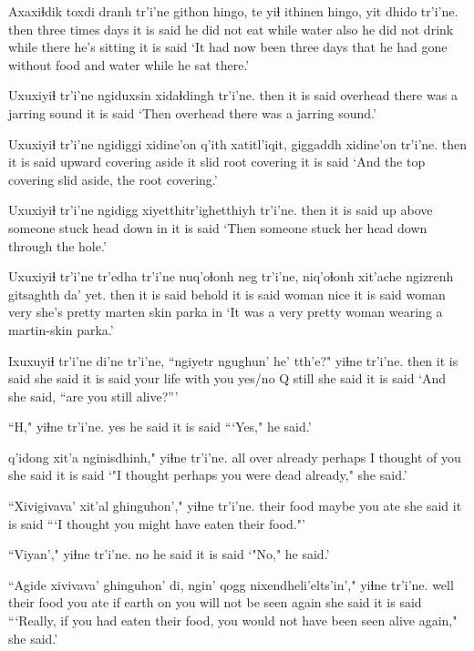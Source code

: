 \documentclass[12pt]{article}
\begin{document}
\gll Axaxiɬdik toxdi dranh tr'i'ne githon hingo, te yiɬ ithinen  hingo, yit dhido tr'i'ne.
then  {three times} days  {it is said} {he did not eat} while water also {he did not drink} while there {he's sitting} {it is said}
\glt `It had now been three days that he had gone without food and water while he sat there.'
\glend

\gll Uxuxiyiɬ tr'i'ne ngiduxsin xidaɬdingh   tr'i'ne.
then  {it is said} overhead {there was a jarring sound} {it is said}
\glt `Then overhead there was a jarring sound.'
\glend

\gll Uxuxiyiɬ tr'i'ne ngidiggi  xidine'on q'ith xatitl'iqit, giggaddh xidine'on tr'i'ne.
then  {it is said} upward covering aside {it slid} root  covering {it is said}
\glt `And the top covering slid aside, the root covering.'
\glend

\gll Uxuxiyiɬ tr'i'ne ngidigg xiyetthitr'ighetthiyh  tr'i'ne.
then  {it is said} {up above} {someone stuck head down in} {it is said}
\glt `Then someone stuck her head down through the hole.'
\glend

\gll Uxuxiyiɬ tr'i'ne tr'edha tr'i'ne nuq'oɬonh neg tr'i'ne, niq'oɬonh xit'ache ngizrenh gitsaghth da' yet.
then  {it is said} behold  {it is said} woman  nice {it is said} woman  very {she's pretty}  {marten skin} parka in
\glt `It was a very pretty woman wearing a martin-skin parka.'
\glend

\gll Ixuxuyiɬ tr'i'ne di'ne tr'i'ne, ``ngiyetr ngughun' he' tth'e?" yiɬne  tr'i'ne.
then  {it is said} {she said} {it is said} {your life} {with you} {yes/no Q} still {she said} {it is said}
\glt `And she said, ``are you still alive?'''
\glend

\gll ``H," yiɬne tr'i'ne.
yes  {he said} {it is said}
\glt ```Yes," he said.'
\glend

 q'idong xit'a  nginisdhinh," yiɬne  tr'i'ne.
{all over}  already  perhaps {I thought of you} {she said} {it is said}
\glt `"I thought perhaps you were dead already," she said.'
\glend

\gll ``Xivigivava' xit'al  ghinguhon'," yiɬne  tr'i'ne.
{their food}  maybe  {you ate} {she said} {it is said}
\glt ```I thought you might have eaten their food."'
\glend

\gll ``Viyan'," yiɬne tr'i'ne.
no  {he said} {it is said}
\glt `"No," he said.'
\glend

\gll ``Agide xivivava' ghinguhon' di, ngin' qogg {nixendheli'elts'in',"} yiɬne  tr'i'ne.
well {their food} {you ate} if earth on {you will not be seen again} {she said} {it is said}
\glt ```Really, if you had eaten their food, you would not have been seen alive again," she said.'
\glend
\end{document}
